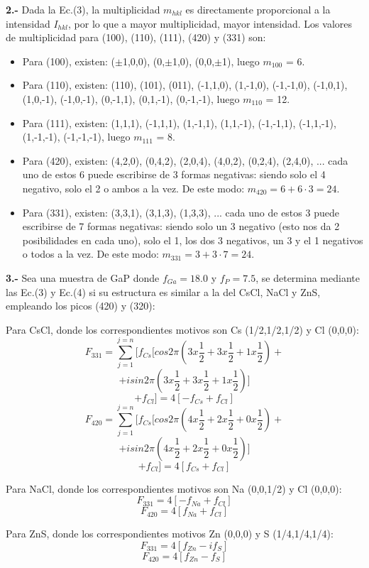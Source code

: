 \documentclass[a4paper,twocolumn,10pt]{article}
\begin{document}
\textbf{2.- } Dada la Ec.(3), la multiplicidad $m_{hkl}$ es directamente proporcional a la intensidad $I_{hkl}$, por lo que a mayor multiplicidad, mayor intensidad. Los valores de multiplicidad para (100), (110), (111), (420) y (331) son:

\begin{itemize}
\item Para (100), existen: ($\pm$1,0,0), (0,$\pm$1,0), (0,0,$\pm$1), luego $m_{100}$ = 6.
\item Para (110), existen: (110), (101), (011), (-1,1,0), (1,-1,0), (-1,-1,0), (-1,0,1), (1,0,-1), (-1,0,-1), (0,-1,1), (0,1,-1), (0,-1,-1),   luego $m_{110}$ = 12.
\item Para (111), existen: (1,1,1), (-1,1,1), (1,-1,1), (1,1,-1), (-1,-1,1), (-1,1,-1), (1,-1,-1), (-1,-1,-1),   luego $m_{111}$ = 8.
\item Para (420), existen: (4,2,0), (0,4,2), (2,0,4), (4,0,2), (0,2,4), (2,4,0), ... cada uno de estos 6 puede escribirse de 3 formas negativas: siendo solo el 4 negativo, solo el 2 o ambos a la vez. De este modo: $m_{420} = 6 + 6\cdot 3 = 24$.
\item Para (331), existen: (3,3,1), (3,1,3), (1,3,3),  ... cada uno de estos 3 puede escribirse de 7 formas negativas: siendo solo un 3 negativo (esto nos da 2 posibilidades en cada uno), solo el 1, los dos 3 negativos, un 3 y el 1 negativos o todos a la vez. De este modo: $m_{331} = 3 + 3\cdot 7 = 24$.
\end{itemize}

\textbf{3.- }  Sea una muestra de GaP donde $f_{Ga} = 18.0$ y $f_{P} =7.5$, se determina mediante las Ec.(3) y Ec.(4) si su estructura es similar a la del CsCl, NaCl y ZnS, empleando los picos (420) y (320):

Para CsCl, donde los correspondientes motivos son Cs (1/2,1/2,1/2) y Cl (0,0,0):
$$
F_{331} = \sum_{j=1}^{j=n} [f_{Cs}[cos2\pi(3x\frac{1}{2} + 3x\frac{1}{2} + 1x\frac{1}{2}) +
$$
$$
+ isin2\pi(3x\frac{1}{2} + 3x\frac{1}{2} + 1x\frac{1}{2})] 
$$
$$
+ f_{Cl}] = 4[-f_{Cs} + f_{Cl}]
$$
$$
F_{420} = \sum_{j=1}^{j=n} [f_{Cs}[cos2\pi(4x\frac{1}{2} + 2x\frac{1}{2} + 0x\frac{1}{2}) +
$$
$$
+ isin2\pi(4x\frac{1}{2} + 2x\frac{1}{2} + 0x\frac{1}{2})] 
$$
$$
+ f_{Cl}] = 4[f_{Cs} + f_{Cl}]
$$

Para NaCl, donde los correspondientes motivos son Na (0,0,1/2) y Cl (0,0,0):
$$
F_{331} =  4[-f_{Na} + f_{Cl}]
$$
$$
F_{420} = 4[f_{Na} + f_{Cl}]
$$

Para ZnS, donde los correspondientes motivos  Zn (0,0,0) y S (1/4,1/4,1/4):
$$
F_{331} =  4[f_{Zn} - if_{S}]
$$
$$
F_{420} = 4[f_{Zn} - f_{S}]
$$
\end{document}
